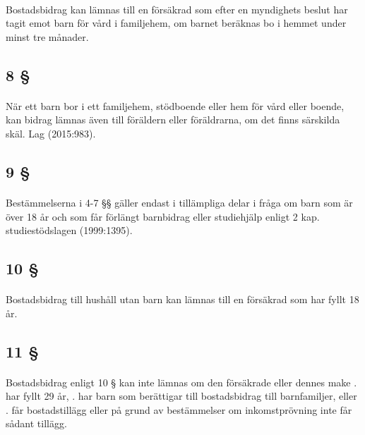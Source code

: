 \documentclass[a4paper,notitlepage,openany,10pt]{book}
\begin{document}
\paragraph*{}
Bostadsbidrag kan lämnas till en försäkrad som efter en myndighets beslut har tagit emot barn för vård i familjehem, om barnet beräknas bo i hemmet under minst tre månader.
\subsection*{8 §}
\paragraph*{}
När ett barn bor i ett familjehem, stödboende eller hem för vård eller boende, kan bidrag lämnas även till föräldern eller föräldrarna, om det finns särskilda skäl.
Lag (2015:983).
\subsection*{9 §}
\paragraph*{}
Bestämmelserna i 4-7 §§ gäller endast i tillämpliga delar i fråga om barn som är över 18 år och som får förlängt barnbidrag eller studiehjälp enligt 2 kap. studiestödslagen (1999:1395).
\subsection*{10 §}
\paragraph*{}
Bostadsbidrag till hushåll utan barn kan lämnas till en försäkrad som har fyllt 18 år.
\subsection*{11 §}
\paragraph*{}
Bostadsbidrag enligt 10 § kan inte lämnas om den försäkrade eller dennes make
. har fyllt 29 år,
. har barn som berättigar till bostadsbidrag till barnfamiljer, eller
. får bostadstillägg eller på grund av bestämmelser om inkomstprövning inte får sådant tillägg.
\end{document}
